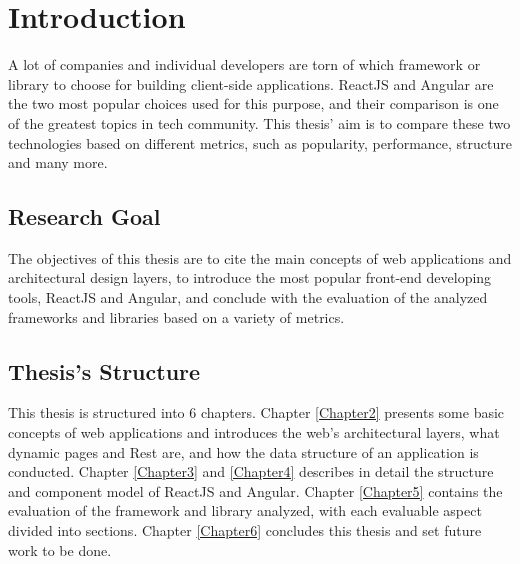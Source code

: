 
\chapter{Introduction} %

\label{Chapter1} %

A lot of companies and individual developers are torn of which framework or library to choose for building client-side applications. ReactJS and Angular are the two most popular choices used for this purpose, and their comparison is one of the greatest topics in tech community. This thesis’ aim is to compare these two technologies based on different metrics, such as popularity, performance, structure and many more. \par

\section{Research Goal}
The objectives of this thesis are to cite the main concepts of web applications and architectural design layers, to introduce the most popular front-end developing tools, ReactJS and Angular, and conclude with the evaluation of the analyzed frameworks and libraries based on a variety of metrics. \par

\section{Thesis's Structure}
This thesis is structured into 6 chapters. Chapter \ref{Chapter2} presents some basic concepts of web applications and introduces the web’s architectural layers, what dynamic pages and Rest are, and how the data structure of an application is conducted. Chapter \ref{Chapter3} and \ref{Chapter4} describes in detail the structure and component model of ReactJS and Angular. Chapter \ref{Chapter5} contains the evaluation of the framework and library analyzed, with each evaluable aspect divided into sections. Chapter \ref{Chapter6} concludes this thesis and set future work to be done.